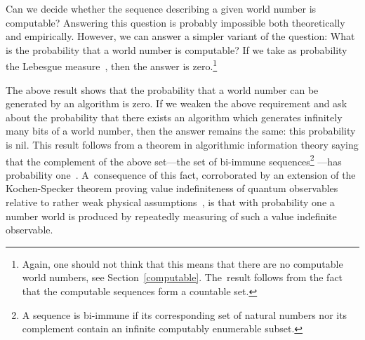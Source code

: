 \documentclass[12pt]{article}
\begin{document}
Can we decide whether  the sequence describing a given world number is computable?
Answering this question is probably impossible  both theoretically and empirically.
However, we can answer a simpler variant of the question: What is the probability that a world number is computable?
If we take as probability the Lebesgue measure~\cite{calude:02}, then the answer is zero.\footnote{Again, one should not think that this means that there are no computable world numbers, see Section~\ref{computable}. The~result follows from the fact that the computable sequences form a countable set.}



The above result shows that the probability that a world
number can be generated by an algorithm is zero.
If we weaken the  above requirement and ask about the probability that
there exists an algorithm which generates  infinitely many bits of a world number,
then the answer remains the same: this probability
is nil.
This result follows from a theorem
in algorithmic information theory saying that the complement
of the above set---the set of  bi-immune sequences\footnote{
A sequence  is bi-immune if  its corresponding set of natural numbers nor its complement contain an infinite computably enumerable subset.}
---has probability one~\cite{calude:02}. A~consequence of this fact,
corroborated   by   an extension of the Kochen-Specker theorem
proving value indefiniteness of quantum observables
relative to rather weak physical assumptions~\cite{vi-aeverywhere-2014}, is that
with probability one a  number world is produced by repeatedly measuring of such a value indefinite observable.
\end{document}
